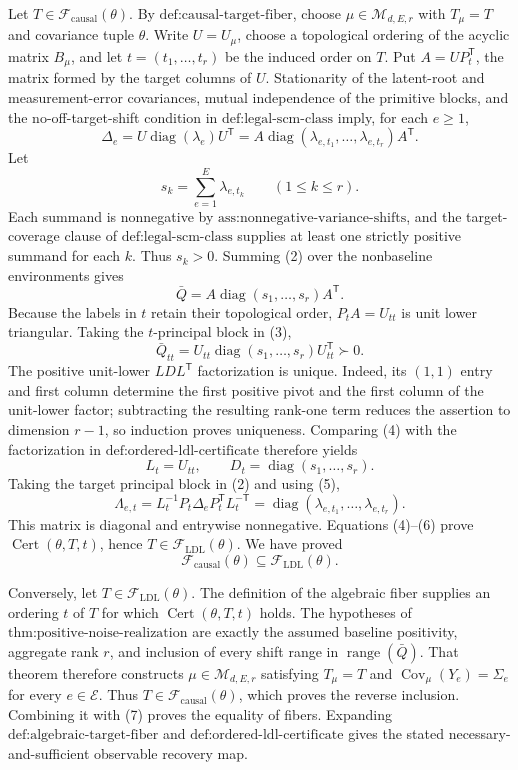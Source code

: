 Let \(T\in\mathcal F_{\mathrm{causal}}(\theta)\).  By \(\text{def:causal-target-fiber}\), choose \(\mu\in\mathcal M_{d,E,r}\) with \(T_\mu=T\) and covariance tuple \(\theta\).  Write \(U=U_\mu\), choose a topological ordering of the acyclic matrix \(B_\mu\), and let \(t=(t_1,\ldots,t_r)\) be the induced order on \(T\).  Put \(A=UP_t^{\mathsf T}\), the matrix formed by the target columns of \(U\).  Stationarity of the latent-root and measurement-error covariances, mutual independence of the primitive blocks, and the no-off-target-shift condition in \(\text{def:legal-scm-class}\) imply, for each \(e\ge1\),
\[
 \Delta_e
 =U\operatorname{diag}(\lambda_e)U^{\mathsf T}
 =A\operatorname{diag}(\lambda_{e,t_1},\ldots,\lambda_{e,t_r})A^{\mathsf T}. \tag{2}
\]
Let
\[
 s_k=\sum_{e=1}^E\lambda_{e,t_k}\qquad(1\le k\le r).
\]
Each summand is nonnegative by \(\text{ass:nonnegative-variance-shifts}\), and the target-coverage clause of \(\text{def:legal-scm-class}\) supplies at least one strictly positive summand for each \(k\).  Thus \(s_k>0\).  Summing (2) over the nonbaseline environments gives
\[
 \bar Q=A\operatorname{diag}(s_1,\ldots,s_r)A^{\mathsf T}. \tag{3}
\]
Because the labels in \(t\) retain their topological order, \(P_tA=U_{tt}\) is unit lower triangular.  Taking the \(t\)-principal block in (3),
\[
 \bar Q_{tt}=U_{tt}\operatorname{diag}(s_1,\ldots,s_r)U_{tt}^{\mathsf T}\succ0. \tag{4}
\]
The positive unit-lower \(LDL^{\mathsf T}\) factorization is unique.  Indeed, its \((1,1)\) entry and first column determine the first positive pivot and the first column of the unit-lower factor; subtracting the resulting rank-one term reduces the assertion to dimension \(r-1\), so induction proves uniqueness.  Comparing (4) with the factorization in \(\text{def:ordered-ldl-certificate}\) therefore yields
\[
 L_t=U_{tt},\qquad D_t=\operatorname{diag}(s_1,\ldots,s_r). \tag{5}
\]
Taking the target principal block in (2) and using (5),
\[
 \Lambda_{e,t}
 =L_t^{-1}P_t\Delta_eP_t^{\mathsf T}L_t^{-\mathsf T}
 =\operatorname{diag}(\lambda_{e,t_1},\ldots,\lambda_{e,t_r}). \tag{6}
\]
This matrix is diagonal and entrywise nonnegative.  Equations (4)--(6) prove \(\operatorname{Cert}(\theta,T,t)\), hence \(T\in\mathcal F_{\mathrm{LDL}}(\theta)\).  We have proved
\[
 \mathcal F_{\mathrm{causal}}(\theta)\subseteq\mathcal F_{\mathrm{LDL}}(\theta). \tag{7}
\]

Conversely, let \(T\in\mathcal F_{\mathrm{LDL}}(\theta)\).  The definition of the algebraic fiber supplies an ordering \(t\) of \(T\) for which \(\operatorname{Cert}(\theta,T,t)\) holds.  The hypotheses of \(\text{thm:positive-noise-realization}\) are exactly the assumed baseline positivity, aggregate rank \(r\), and inclusion of every shift range in \(\operatorname{range}(\bar Q)\).  That theorem therefore constructs \(\mu\in\mathcal M_{d,E,r}\) satisfying \(T_\mu=T\) and \(\operatorname{Cov}_\mu(Y_e)=\Sigma_e\) for every \(e\in\mathcal E\).  Thus \(T\in\mathcal F_{\mathrm{causal}}(\theta)\), which proves the reverse inclusion.  Combining it with (7) proves the equality of fibers.  Expanding \(\text{def:algebraic-target-fiber}\) and \(\text{def:ordered-ldl-certificate}\) gives the stated necessary-and-sufficient observable recovery map.

